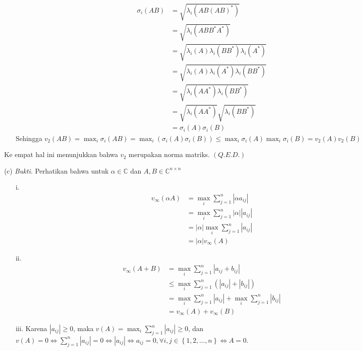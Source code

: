 \documentclass[11pt,a4paper]{article}
\newcommand{\ds}{\displaystyle}
\theoremstyle{plain}
\theoremstyle{definition}
\theoremstyle{remark}
\begin{document}
\begin{enumerate}
\begin{enumerate}
\begin{enumerate}
\begin{enumerate}
			\begin{align*}
			\sigma_{i}(AB) &=\sqrt{\lambda_{i}(AB(AB)^{\ast})} \\
			&=\sqrt{\lambda_{i}(ABB^{\ast}A^{\ast})} \\
			&=\sqrt{\lambda_{i}(A) \lambda_{i}(BB^{\ast}) \lambda_{i}(A^{\ast})} \\
			&=\sqrt{\lambda_{i}(A) \lambda_{i}(A^{\ast}) \lambda_{i}(BB^{\ast})}   \\
			&=\sqrt{\lambda_{i}(AA^{\ast}) \lambda_{i}(BB^{\ast})}   \\
			&=\sqrt{\lambda_{i}(AA^{\ast})} \sqrt{\lambda_{i}(BB^{\ast})} \\
			&= \sigma_{i}(A)\sigma_{i}(B) 
			\end{align*}
			Sehingga $v_{2}(AB)=\ds \max_{i}\sigma_{i}(AB)=\max_{i}(\sigma_{i}(A)\sigma_{i}(B))\leq \max_{i}\sigma_{i}(A)\max_{i}\sigma_{i}(B)=v_{2}(A)v_{2}(B)$
		\end{enumerate}
		Ke empat hal ini menunjukkan bahwa $v_{2}$ merupakan norma matriks. $(Q.E.D.)$
		\item[(c)] \textit{Bukti.} Perhatikan bahwa untuk $\alpha\in \mathbb{C}$ dan $A,B\in \mathbb{C}^{n\times n}$ 
		\begin{enumerate}
			\item[i.] 
			\begin{align*}
			v_{\infty}(\alpha A) &=\ds \max_{i} \sum_{j=1}^{n} \left| \alpha a_{ij}\right| \\
			&=\ds \max_{i} \sum_{j=1}^{n} \left| \alpha \right| \left| a_{ij}\right| \\
			&=\ds \left| \alpha \right| \max_{i} \sum_{j=1}^{n} \left| a_{ij}\right| \\
			&= \left| \alpha \right| v_{\infty}(A)
			\end{align*}
			\item[ii.] 
			\begin{align*}
			v_{\infty}(A+B) &=\ds \max_{i} \sum_{j=1}^{n} \left| a_{ij}+b_{ij}\right| \\
			&\leq \ds \max_{i} \sum_{j=1}^{n} (\left| a_{ij}\right|+\left| b_{ij}\right|) \\
			&=\ds \max_{i} \sum_{j=1}^{n} \left| a_{ij}\right| + \max_{i} \sum_{j=1}^{n} \left| b_{ij}\right| \\
			&= v_{\infty}(A)+v_{\infty}(B)
			\end{align*}
			\item[iii.] Karena $\left| a_{ij}\right| \geq 0$, maka $v(A)=\ds \max_{i} \sum_{j=1}^{n} \left| a_{ij}\right|\geq 0$, dan $\ds v(A)=0 \Leftrightarrow \sum_{j=1}^{n} \left| a_{ij}\right|=0 \Leftrightarrow \left| a_{ij}\right| \Leftrightarrow a_{ij}=0, \forall i,j\in\left\{ 1,2,\ldots,n\right\} \Leftrightarrow A=0$.

\end{enumerate}
\end{enumerate}
\end{enumerate}
\end{enumerate}
\end{document}
